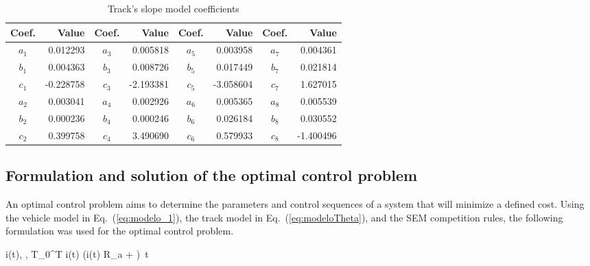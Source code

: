\begin{table}[!h]
	\centering
    \caption{Track's slope model coefficients}
	\label{tab:coeficientes}
	\begin{tabular}{crcrcrcr}
		\toprule
		\textbf{Coef.} & \textbf{Value} & \textbf{Coef.} & \textbf{Value} & \textbf{Coef.} & \textbf{Value} & \textbf{Coef.} & \textbf{Value}\\
		\midrule
        $a_1$   & 0.012293 & $a_3$   & 0.005818 & $a_5$   & 0.003958 & $a_7$   & 0.004361  \\
        $b_1$   & 0.004363 & $b_3$   & 0.008726 & $b_5$   & 0.017449 & $b_7$   & 0.021814  \\
        $c_1$   &-0.228758 & $c_3$   &-2.193381 & $c_5$   &-3.058604 & $c_7$   & 1.627015  \\
        $a_2$   & 0.003041 & $a_4$   & 0.002926 & $a_6$   & 0.005365 & $a_8$   & 0.005539  \\
        $b_2$   & 0.000236 & $b_4$   & 0.000246 & $b_6$   & 0.026184 & $b_8$   & 0.030552  \\
        $c_2$   & 0.399758 & $c_4$   & 3.490690 & $c_6$   & 0.579933 & $c_8$   &-1.400496  \\
		\bottomrule
	\end{tabular}
\end{table}

\newpage

\subsection{Formulation and solution of the optimal control problem}

An optimal control problem aims to determine the parameters and control sequences of a system that will minimize a defined cost.
Using the vehicle model in Eq.~(\ref{eq:modelo_1}), the track model in Eq.~(\ref{eq:modeloTheta}), and the SEM competition rules, the following formulation was used for the optimal control problem.

\begin{mini!}
	{i(t), \varphi, T}{\int_{0}^{T} i(t) \cdot \left(i(t) \cdot R_a +  \right) \,t \label{eq:ObjOCP_final}}
	{\label{eq:formulacaoOCP_final}}{}
\end{mini!}


